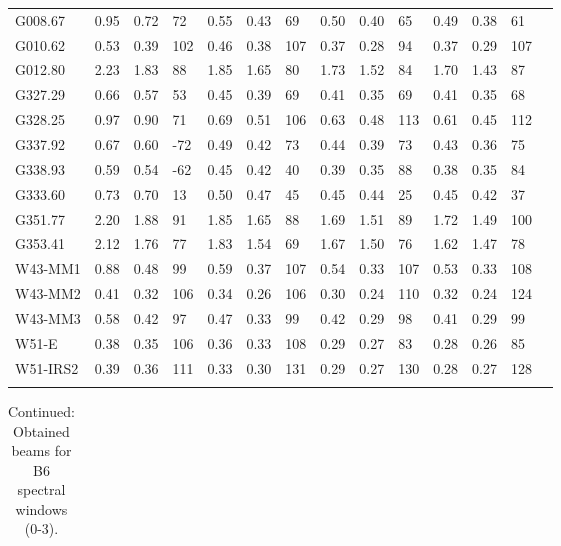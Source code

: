 \documentclass[longauth]{aa} %
\begin{document}
\begin{appendix}
\begin{table}[htbp!]
\begin{tabular}{@{\extracolsep{3pt}}llllllllllllll@{}}
G008.67  &    0.95&0.72&72&0.55&0.43&69&0.50&0.40&65&0.49&0.38&61 \\
G010.62  &    0.53&0.39&102&0.46&0.38&107&0.37&0.28&94&0.37&0.29&107 \\
G012.80  &   2.23&1.83&88&1.85&1.65&80&1.73&1.52&84&1.70&1.43&87 \\
G327.29  &   0.66&0.57&53&0.45&0.39&69&0.41&0.35&69&0.41&0.35&68 \\
G328.25  &   0.97&0.90&71&0.69&0.51&106&0.63&0.48&113&0.61&0.45&112 \\
G337.92  &   0.67&0.60&-72&0.49&0.42&73&0.44&0.39&73&0.43&0.36&75 \\
G338.93  &   0.59&0.54&-62&0.45&0.42&40&0.39&0.35&88&0.38&0.35&84 \\
G333.60  &   0.73&0.70&13&0.50&0.47&45&0.45&0.44&25&0.45&0.42&37 \\
G351.77  &   2.20&1.88&91&1.85&1.65&88&1.69&1.51&89&1.72&1.49&100 \\
G353.41  &   2.12&1.76&77&1.83&1.54&69&1.67&1.50&76&1.62&1.47&78 \\
W43-MM1  &    0.88&0.48&99&0.59&0.37&107&0.54&0.33&107&0.53&0.33&108 \\
W43-MM2  &   0.41&0.32&106&0.34&0.26&106&0.30&0.24&110&0.32&0.24&124 \\
W43-MM3  &  0.58&0.42&97&0.47&0.33&99&0.42&0.29&98&0.41&0.29&99 \\
W51-E  &   0.38&0.35&106&0.36&0.33&108&0.29&0.27&83&0.28&0.26&85 \\
W51-IRS2  &   0.39&0.36&111&0.33&0.30&131&0.29&0.27&130&0.28&0.27&128 \\

\hline \noalign {\smallskip}
\end{tabular}

%
\end{table}
\begin{table}[htbp!]
\ContinuedFloat
\centering
\caption{Continued: Obtained beams for B6 spectral windows (0-3).}
 \begin{tabular}{@{\extracolsep{3pt}}llllllllllllll@{}}


\end{tabular}
\end{table}
\end{appendix}
\end{document}
